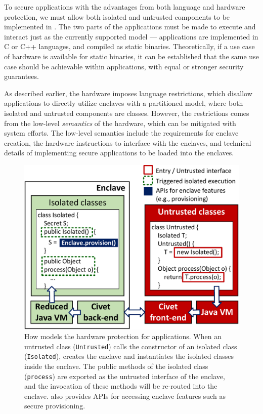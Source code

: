 
To secure applications with the advantages from both \java{} language and \sgx{} hardware protection,
we must allow both isolated and untrusted components to be implemented in \java{}.
The two parts of the applications must be made to execute and interact
just as the currently supported model --- applications are implemented in C or C++ languages,
and compiled as static binaries.
Theoretically, if a use case of \sgx{} hardware is available for static binaries,
it can be established that the same use case
should be achievable within \java{} applications, with equal or stronger security guarantees.

As described earlier,
the \sgx{} hardware imposes language restrictions, which disallow \java{} applications to directly utilize enclaves
with a partitioned model,
where both isolated and untrusted components are \java{} classes.
However, the restrictions comes from the low-level {\em semantics} of
the \sgx{} hardware, which can be mitigated with system efforts.
The low-level semantics include the requirements for enclave creation,
the hardware instructions to interface with the enclaves,
and technical details of implementing secure applications to be loaded into the enclaves.

\begin{figure}[t!]
\centering
\includegraphics[width=0.9\linewidth]{figures/synthesis.pdf}
\footnotesize
\caption{How \sysname{} models the \sgx{} hardware protection for \java{} applications.
When an untrusted class ({\tt Untrusted}) calls the constructor of an isolated class ({\tt Isolated}),
\sysname{} creates the enclave and instantiates the isolated classes
inside the enclave. 
The public methods of the isolated class ({\tt process}) are exported
as the untrusted interface of the enclave, and the invocation of these methods will be re-routed into the enclave.
\sysname{} also provides APIs for accessing enclave features such as secure provisioning.
}
\label{fig:synthesis}
\end{figure}

